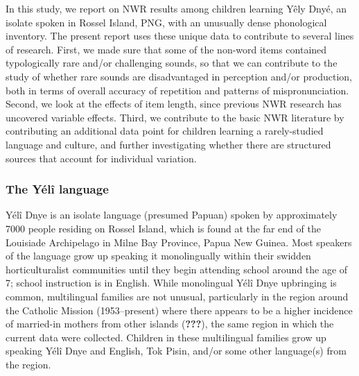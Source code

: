 \documentclass[english,,man,floatsintext]{apa6}
\begin{document}
In this study, we report on NWR results among children learning Yêly
Dnyé, an isolate spoken in Rossel Island, PNG, with an unusually dense
phonological inventory. The present report uses these unique data to
contribute to several lines of research. First, we made sure that some
of the non-word items contained typologically rare and/or challenging
sounds, so that we can contribute to the study of whether rare sounds
are disadvantaged in perception and/or production, both in terms of
overall accuracy of repetition and patterns of mispronunciation. Second,
we look at the effects of item length, since previous NWR research has
uncovered variable effects. Third, we contribute to the basic NWR
literature by contributing an additional data point for children
learning a rarely-studied language and culture, and further
investigating whether there are structured sources that account for
individual variation.

\subsubsection{The Yélî language}\label{the-yuxe9luxee-language}

Yélî Dnye is an isolate language (presumed Papuan) spoken by
approximately 7000 people residing on Rossel Island, which is found at
the far end of the Louisiade Archipelago in Milne Bay Province, Papua
New Guinea. Most speakers of the language grow up speaking it
monolingually within their swidden horticulturalist communities until
they begin attending school around the age of 7; school instruction is
in English. While monolingual Yélî Dnye upbringing is common,
multilingual families are not unusual, particularly in the region around
the Catholic Mission (1953--present) where there appears to be a higher
incidence of married-in mothers from other islands ({\textbf{???}}), the
same region in which the current data were collected. Children in these
multilingual families grow up speaking Yélî Dnye and English, Tok Pisin,
and/or some other language(s) from the region.
\end{document}
